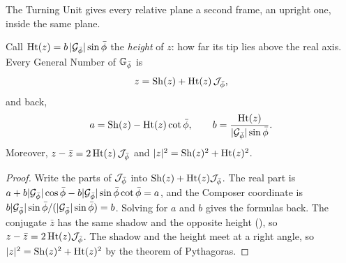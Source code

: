 The Turning Unit gives every relative plane a second frame, an upright one, inside the same plane.

\begin{proposition}\label{prop:gn-shadow-height}
Call $\Ht(z) = b\,|\Gp|\sin\pb$ the \emph{height} of $z$: how far its tip lies above the real axis. Every General Number of $\GNp$ is
\[
z = \Sh(z) + \Ht(z)\,\Jp ,
\]
and back,
\[
a = \Sh(z) - \Ht(z)\cot\pb , \qquad b = \frac{\Ht(z)}{|\Gp|\sin\pb} .
\]
Moreover, $z - \bar{z} = 2\Ht(z)\,\Jp$ and $|z|^2 = \Sh(z)^2 + \Ht(z)^2$.
\end{proposition}

\begin{proof}
Write the parts of $\Jp$ into $\Sh(z) + \Ht(z)\Jp$. The real part is $a + b|\Gp|\cos\pb - b|\Gp|\sin\pb\cot\pb = a$, and the Composer coordinate is $b|\Gp|\sin\pb/(|\Gp|\sin\pb) = b$. Solving for $a$ and $b$ gives the formulas back. The conjugate $\bar{z}$ has the same shadow and the opposite height (), so $z - \bar{z} = 2\Ht(z)\Jp$. The shadow and the height meet at a right angle, so $|z|^2 = \Sh(z)^2 + \Ht(z)^2$ by the theorem of Pythagoras.
\end{proof}


